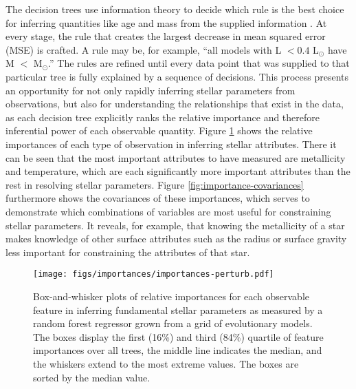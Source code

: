 \documentclass[manuscript]{aastex}
\begin{document}
The decision trees use information theory to decide which rule is the best choice for inferring quantities like age and mass from the supplied information \citep[see chapter 9 of][]{hastie2005elements}. At every stage, the rule that creates the largest decrease in mean squared error (MSE) is crafted. A rule may be, for example, ``all models with L $<0.4$ L$_\odot$ have M $<$ M$_\odot$.'' The rules are refined until every data point that was supplied to that particular tree is fully explained by a sequence of decisions. This process presents an opportunity for not only rapidly inferring stellar parameters from observations, but also for understanding the relationships that exist in the data, as each decision tree explicitly ranks the relative importance and therefore inferential power of each observable quantity. Figure \ref{fig:importances} shows the relative importances of each type of observation in inferring stellar attributes. There it can be seen that the most important attributes to have measured are metallicity and temperature, which are each significantly more important attributes than the rest in resolving stellar parameters. Figure \ref{fig:importance-covariances} furthermore shows the covariances of these importances, which serves to demonstrate which combinations of variables are most useful for constraining stellar parameters. It reveals, for example, that knowing the metallicity of a star makes knowledge of other surface attributes such as the radius or surface gravity less important for constraining the attributes of that star. 

\begin{figure}
    \centering
    \texttt{[image: figs/importances/importances-perturb.pdf]}
    \caption{Box-and-whisker plots of relative importances for each observable feature in inferring fundamental stellar parameters as measured by a random forest regressor grown from a grid of evolutionary models. The boxes display the first (16\%) and third (84\%) quartile of feature importances over all trees, the middle line indicates the median, and the whiskers extend to the most extreme values. The boxes are sorted by the median value.}
    \label{fig:importances}
\end{figure}
\end{document}
